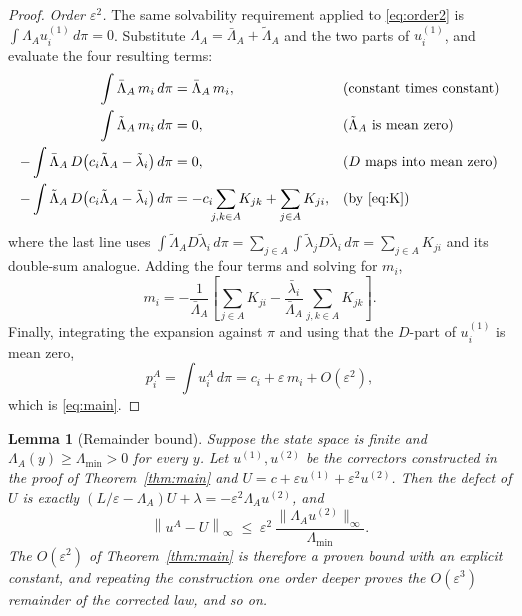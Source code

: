 \documentclass[11pt]{article}
\newtheorem{lemma}{Lemma}
\theoremstyle{remark}
\newcommand{\lbar}{\bar{\lambda}}
\begin{document}
\begin{proof}
\emph{Order $\varepsilon^2$.} The same solvability requirement applied to
\eqref{eq:order2} is $\int \Lambda_A u^{(1)}_i \, d\pi = 0$. Substitute
$\Lambda_A = \bar\Lambda_A + \tilde\Lambda_A$ and the two parts of
$u^{(1)}_i$, and evaluate the four resulting terms:
\begin{align*}
  \int \bar\Lambda_A\, m_i \, d\pi &= \bar\Lambda_A\, m_i ,
  &&\text{(constant times constant)}\\
  \int \tilde\Lambda_A\, m_i \, d\pi &= 0 ,
  &&\text{($\tilde\Lambda_A$ is mean zero)}\\
  -\int \bar\Lambda_A \, D\!\left(c_i\tilde\Lambda_A
    - \tilde\lambda_i\right) d\pi &= 0 ,
  &&\text{($D$ maps into mean zero)}\\
  -\int \tilde\Lambda_A \, D\!\left(c_i\tilde\Lambda_A
    - \tilde\lambda_i\right) d\pi
  &= -c_i \!\!\sum_{j,k\in A}\!\! K_{jk}
     + \sum_{j\in A} K_{ji} ,
  &&\text{(by \eqref{eq:K})}
\end{align*}
where the last line uses
$\int \tilde\Lambda_A D \tilde\lambda_i \, d\pi
= \sum_{j\in A} \int \tilde\lambda_j D\tilde\lambda_i \, d\pi
= \sum_{j\in A} K_{ji}$ and its double-sum analogue. Adding the four terms
and solving for $m_i$,
\[
  m_i = -\frac{1}{\bar\Lambda_A}
        \left[\sum_{j\in A}K_{ji}
        - \frac{\lbar_i}{\bar\Lambda_A}\sum_{j,k\in A}K_{jk}\right].
\]
Finally, integrating the expansion against $\pi$ and using that the $D$-part
of $u^{(1)}_i$ is mean zero,
\[
  p_i^A = \int u_i^A \, d\pi
        = c_i + \varepsilon\, m_i + O(\varepsilon^2),
\]
which is \eqref{eq:main}.
\end{proof}

\begin{lemma}[Remainder bound]\label{lem:remainder}
Suppose the state space is finite and $\Lambda_A(y) \ge \Lambda_{\min} > 0$
for every $y$. Let $u^{(1)}, u^{(2)}$ be the correctors constructed in the
proof of Theorem~\ref{thm:main} and $U = c + \varepsilon u^{(1)} +
\varepsilon^2 u^{(2)}$. Then the defect of $U$ is exactly
$(L/\varepsilon - \Lambda_A)U + \lambda = -\varepsilon^2 \Lambda_A u^{(2)}$,
and
\[
  \left\| u^A - U \right\|_\infty
  \;\le\; \varepsilon^2 \,
  \frac{\|\Lambda_A u^{(2)}\|_\infty}{\Lambda_{\min}} .
\]
The $O(\varepsilon^2)$ of Theorem~\ref{thm:main} is therefore a proven bound
with an explicit constant, and repeating the construction one order deeper
proves the $O(\varepsilon^3)$ remainder of the corrected law, and so on.
\end{lemma}
\end{document}
